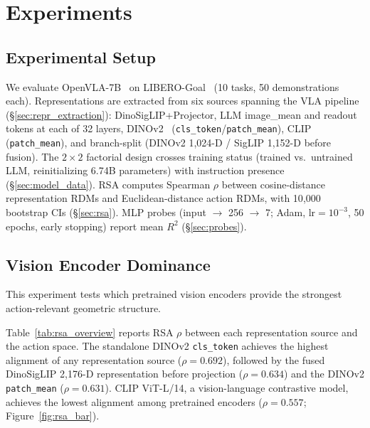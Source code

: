 \section{Experiments}
\label{sec:experiments}

\subsection{Experimental Setup}
\label{sec:setup}

We evaluate OpenVLA-7B~\cite{kim2024_openvla,karamcheti2024} on LIBERO-Goal~\cite{liu2023_libero} (10 tasks, 50 demonstrations each).
Representations are extracted from six sources spanning the VLA pipeline (\S\ref{sec:repr_extraction}): DinoSigLIP+Projector, LLM image\_mean and readout tokens at each of 32 layers, DINOv2~\cite{oquab2024_dinov2} (\texttt{cls\_token}/\texttt{patch\_mean}), CLIP~\cite{radford2021_clip} (\texttt{patch\_mean}), and branch-split (DINOv2 1{,}024-D / SigLIP 1{,}152-D before fusion).
The $2\times 2$ factorial design crosses training status (trained vs.\ untrained LLM, reinitializing 6.74B parameters) with instruction presence (\S\ref{sec:model_data}).
RSA computes Spearman $\rho$ between cosine-distance representation RDMs and Euclidean-distance action RDMs, with 10{,}000 bootstrap CIs (\S\ref{sec:rsa}).
MLP probes (input $\to$ 256 $\to$ 7; Adam, lr${}=10^{-3}$, 50 epochs, early stopping) report mean $R^2$ (\S\ref{sec:probes}).

\subsection{Vision Encoder Dominance}
\label{sec:vision_dominance}

This experiment tests which pretrained vision encoders provide the strongest action-relevant geometric structure.

Table~\ref{tab:rsa_overview} reports RSA $\rho$ between each representation source and the action space.
The standalone DINOv2 \texttt{cls\_token} achieves the highest alignment of any representation source ($\rho = 0.692$), followed by the fused DinoSigLIP 2{,}176-D representation before projection ($\rho = 0.634$) and the DINOv2 \texttt{patch\_mean} ($\rho = 0.631$).
CLIP ViT-L/14, a vision-language contrastive model, achieves the lowest alignment among pretrained encoders ($\rho = 0.557$; Figure~\ref{fig:rsa_bar}).

